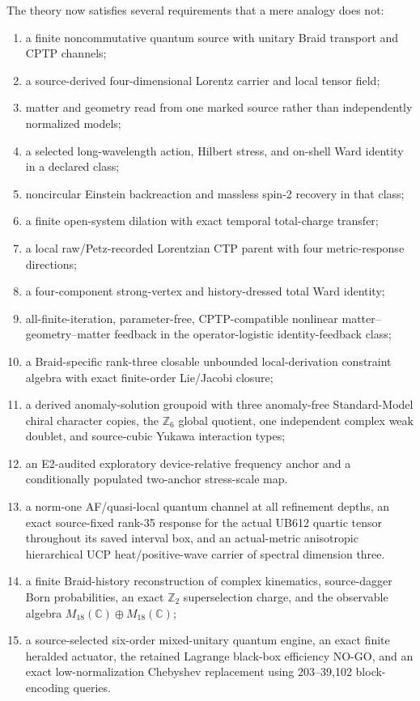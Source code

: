 \documentclass[11pt]{article}
\theoremstyle{definition}
\theoremstyle{remark}
\begin{document}
The theory now satisfies several requirements that a mere analogy does not:
\begin{enumerate}
\item a finite noncommutative quantum source with unitary Braid transport and CPTP channels;
\item a source-derived four-dimensional Lorentz carrier and local tensor field;
\item matter and geometry read from one marked source rather than independently normalized models;
\item a selected long-wavelength action, Hilbert stress, and on-shell Ward identity in a declared class;
\item noncircular Einstein backreaction and massless spin-2 recovery in that class;
\item a finite open-system dilation with exact temporal total-charge transfer;
\item a local raw/Petz-recorded Lorentzian CTP parent with four metric-response directions;
\item a four-component strong-vertex and history-dressed total Ward identity;
\item all-finite-iteration, parameter-free, CPTP-compatible nonlinear matter--geometry--matter feedback in the operator-logistic identity-feedback class;
\item a Braid-specific rank-three closable unbounded local-derivation constraint algebra with exact finite-order Lie/Jacobi closure;
\item a derived anomaly-solution groupoid with three anomaly-free Standard-Model chiral character copies, the $\mathbb Z_6$ global quotient, one independent complex weak doublet, and source-cubic Yukawa interaction types;
\item an E2-audited exploratory device-relative frequency anchor and a conditionally populated two-anchor stress-scale map.
\item a norm-one AF/quasi-local quantum channel at all refinement depths, an exact source-fixed rank-35 response for the actual UB612 quartic tensor throughout its saved interval box, and an actual-metric anisotropic hierarchical UCP heat/positive-wave carrier of spectral dimension three.
\item a finite Braid-history reconstruction of complex kinematics, source-dagger Born probabilities, an exact $\mathbb Z_2$ superselection charge, and the observable algebra $M_{18}(\mathbb C)\oplus M_{18}(\mathbb C)$;
\item a source-selected six-order mixed-unitary quantum engine, an exact finite heralded actuator, the retained Lagrange black-box efficiency NO-GO, and an exact low-normalization Chebyshev replacement using 203--39,102 block-encoding queries.
\end{enumerate}
\end{document}
